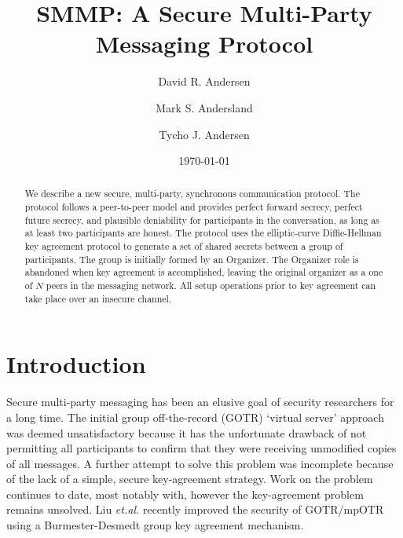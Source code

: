 \documentclass[%
preprint,
amsmath,amssymb,
aps,
prb,
floatfix,
]{revtex4-1}
\begin{document}

\title{SMMP: A Secure Multi-Party Messaging Protocol}%

\author{David R. Andersen}
\author{Mark S. Andersland}
\author{Tycho J. Andersen}

\date{\today}%

\begin{abstract}
We describe a new secure, multi-party, synchronous communication protocol.
The protocol follows a peer-to-peer model and provides perfect forward
secrecy, perfect future secrecy, and plausible deniability for participants in
the conversation, as long as at least two participants are honest.
The protocol uses the elliptic-curve Diffie-Hellman key agreement
protocol to generate a set of shared secrets between a group of
participants. The group is initially formed by an Organizer.
The Organizer role is abandoned when key agreement is accomplished, leaving
the original organizer as a one of $N$ peers in the messaging network.
All setup operations prior to key agreement can take place over an insecure
channel.
\end{abstract}

\maketitle

\section{\label{sec:Introduction}Introduction}
Secure multi-party messaging has been an elusive goal of security researchers
for a long time. The initial group off-the-record (GOTR) `virtual server'
approach\cite{ref:bian} was deemed unsatisfactory
because it has the unfortunate drawback of not permitting all participants to
confirm that they were receiving unmodified copies of all messages.
A further attempt to solve this problem\cite{ref:goldberg} was incomplete
because of the lack of a simple, secure key-agreement
strategy. Work on the problem
continues to date, most notably with\cite{ref:cryptocat}, however the
key-agreement problem remains unsolved. Liu \textit{et.al.}\cite{ref:liu}
recently improved the security of GOTR/mpOTR using a Burmester-Desmedt group
key agreement mechanism.
\end{document}
